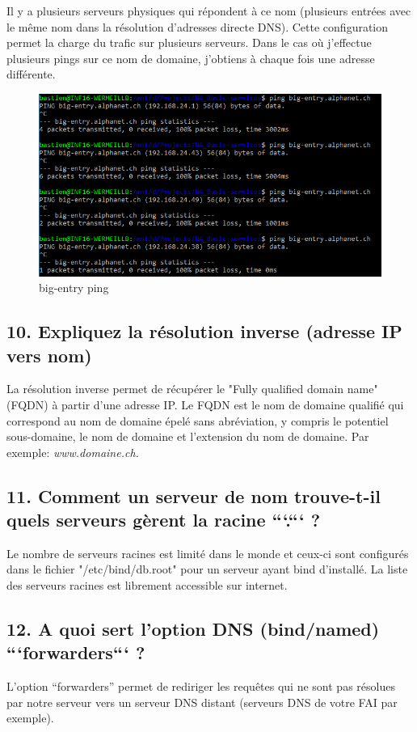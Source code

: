 \documentclass{article}
\begin{document}
Il y a plusieurs serveurs physiques qui répondent à ce nom (plusieurs entrées avec le même nom dans la résolution d'adresses directe DNS). Cette configuration permet la charge du trafic sur plusieurs serveurs. Dans le cas où j'effectue plusieurs pings sur ce nom de domaine, j'obtiens à chaque fois une adresse différente.

\begin{figure}[h]
	\centering
	\includegraphics{./captures/ping-bigentry.png}
	\caption{big-entry ping}
	\label{fig:Strates}
\end{figure}
\clearpage

\subsection*{10. Expliquez la résolution inverse (adresse IP vers nom)}
La résolution inverse permet de récupérer le "Fully qualified domain name" (FQDN) à partir d'une adresse IP. Le FQDN est le nom de domaine qualifié qui correspond au nom de domaine épelé sans abréviation, y compris le potentiel sous-domaine, le nom de domaine et l'extension du nom de domaine. Par exemple:
\textit{www.domaine.ch.}

\subsection*{11. Comment un serveur de nom trouve-t-il quels serveurs gèrent la racine ```.``` ?}
Le nombre de serveurs racines est limité dans le monde et ceux-ci sont configurés dans le fichier "/etc/bind/db.root" pour un serveur ayant bind d'installé. La liste des serveurs racines est librement accessible sur internet.

\subsection*{12. A quoi sert l’option DNS (bind/named) ```forwarders``` ?}
L'option “forwarders” permet de rediriger les requêtes qui ne sont pas résolues par notre serveur vers un serveur DNS distant (serveurs DNS de votre FAI par exemple)\cite{dns-forwarding}.
\end{document}
